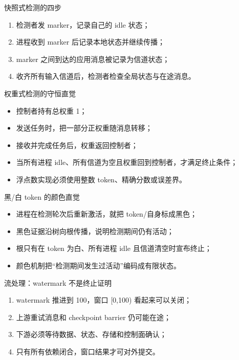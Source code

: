 \documentclass[UTF8,fontset=none,aspectratio=169,10pt]{beamer}
\begin{document}
\begin{frame}{快照式检测的四步}
\begin{enumerate}
  \item 检测者发 marker，记录自己的 idle 状态；
  \item 进程收到 marker 后记录本地状态并继续传播；
  \item marker 之间到达的应用消息被记录为信道状态；
  \item 收齐所有输入信道后，检测者检查全局状态与在途消息。
\end{enumerate}
\vfill
{}
\end{frame}

\begin{frame}{权重式检测的守恒直觉}
\begin{itemize}
  \item 控制者持有总权重 1；
  \item 发送任务时，把一部分正权重随消息转移；
  \item 接收并完成任务后，权重返回控制者；
  \item 当所有进程 idle、所有信道为空且权重回到控制者，才满足终止条件；
  \item 浮点数实现必须使用整数 token、精确分数或误差界。
\end{itemize}
\end{frame}

\begin{frame}{黑/白 token 的颜色直觉}
\begin{itemize}
  \item 进程在检测轮次后重新激活，就把 token/自身标成黑色；
  \item 黑色证据沿树向根传播，说明检测期间仍有活动；
  \item 根只有在 token 为白、所有进程 idle 且信道清空时宣布终止；
  \item 颜色机制把“检测期间发生过活动”编码成有限状态。
\end{itemize}
\end{frame}

\begin{frame}{流处理：watermark 不是终止证明}
\begin{enumerate}
  \item watermark 推进到 100，窗口 [0,100) 看起来可以关闭；
  \item 上游重试消息和 checkpoint barrier 仍可能在途；
  \item 下游必须等待数据、状态、存储和控制面确认；
  \item 只有所有依赖闭合，窗口结果才可对外提交。
\end{enumerate}
\end{frame}
\end{document}
